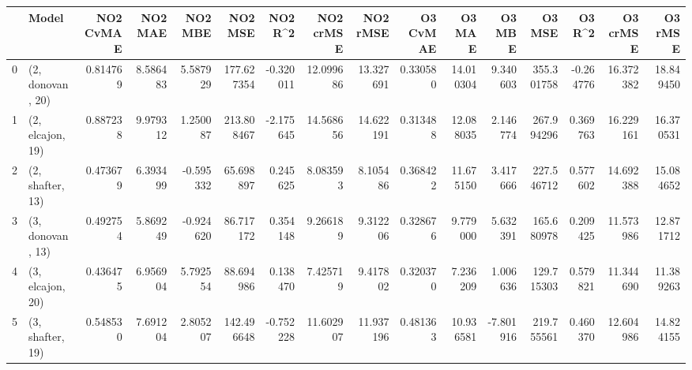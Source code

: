 \begin{tabular}{llrrrrrrrrrrrrrr}
\toprule
{} &             Model &  NO2 CvMAE &   NO2 MAE &   NO2 MBE &     NO2 MSE &   NO2 R\textasciicircum2 &  NO2 crMSE &   NO2 rMSE &  O3 CvMAE &     O3 MAE &    O3 MBE &      O3 MSE &    O3 R\textasciicircum2 &   O3 crMSE &    O3 rMSE \\
\midrule
0 &  (2, donovan, 20) &   0.814769 &  8.586483 &  5.587929 &  177.627354 & -0.320011 &  12.099686 &  13.327691 &  0.330580 &  14.010304 &  9.340603 &  355.301758 & -0.264776 &  16.372382 &  18.849450 \\
1 &  (2, elcajon, 19) &   0.887238 &  9.979312 &  1.250087 &  213.808467 & -2.175645 &  14.568656 &  14.622191 &  0.313488 &  12.088035 &  2.146774 &  267.994296 &  0.369763 &  16.229161 &  16.370531 \\
2 &  (2, shafter, 13) &   0.473679 &  6.393499 & -0.595332 &   65.698897 &  0.245625 &   8.083593 &   8.105486 &  0.368422 &  11.675150 &  3.417666 &  227.546712 &  0.577602 &  14.692388 &  15.084652 \\
3 &  (3, donovan, 13) &   0.492754 &  5.869249 & -0.924620 &   86.717172 &  0.354148 &   9.266189 &   9.312206 &  0.328676 &   9.779000 &  5.632391 &  165.680978 &  0.209425 &  11.573986 &  12.871712 \\
4 &  (3, elcajon, 20) &   0.436475 &  6.956904 &  5.792554 &   88.694986 &  0.138470 &   7.425719 &   9.417802 &  0.320370 &   7.236209 &  1.006636 &  129.715303 &  0.579821 &  11.344690 &  11.389263 \\
5 &  (3, shafter, 19) &   0.548530 &  7.691204 &  2.805207 &  142.496648 & -0.752228 &  11.602907 &  11.937196 &  0.481363 &  10.936581 & -7.801916 &  219.755561 &  0.460370 &  12.604986 &  14.824155 \\
\bottomrule
\end{tabular}
